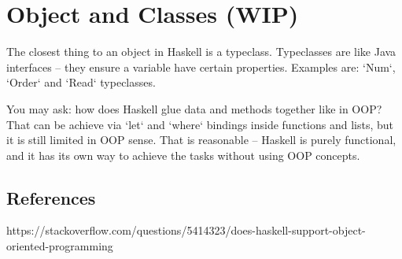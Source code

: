 \documentclass{article}
\begin{document}
\section{Object and Classes (WIP)}

The closest thing to an object in Haskell is a typeclass. Typeclasses are like Java interfaces -- they ensure a variable have certain properties. Examples are: `Num`, `Order` and `Read` typeclasses.

You may ask: how does Haskell glue data and methods together like in OOP? That can be achieve via `let` and `where` bindings inside functions and lists, but it is still limited in OOP sense. That is reasonable -- Haskell is purely functional, and it has its own way to achieve the tasks without using OOP concepts.

\subsection{References}
https://stackoverflow.com/questions/5414323/does-haskell-support-object-oriented-programming
\end{document}
